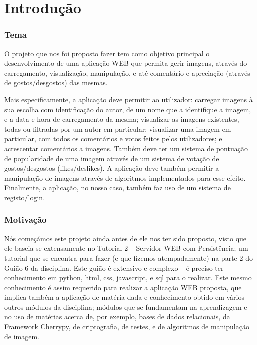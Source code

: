 \documentclass{report}
\begin{document}
\chapter{Introdução}
\label{chap.introducao}

\subsection{Tema}

O projeto que nos foi proposto fazer tem como objetivo principal o desenvolvimento de uma aplicação WEB que permita gerir imagens, através do carregamento, visualização, manipulação, e até comentário e apreciação (através de gostos/desgostos) das mesmas.

\linebreak
\bigskip

Mais especificamente, a aplicação deve permitir ao utilizador: carregar imagens à sua escolha com identificação do autor, de um nome que a identifique a imagem, e a data e hora de carregamento da mesma; visualizar as imagens existentes, todas ou filtradas por um autor em particular; visualizar uma imagem em particular, com todos os comentários e votos feitos pelos utilizadores; e acrescentar comentários a imagens. Também deve ter um sistema de pontuação de popularidade de uma imagem através de um sistema de votação de gostos/desgostos (likes/deslikes). A aplicação deve também permitir a manipulação de imagens através de algoritmos implementados para esse efeito. Finalmente, a aplicação, no nosso caso, também faz uso de um sistema de registo/login.

\subsection{Motivação}

Nós começámos este projeto ainda antes de ele nos ter sido proposto, visto que ele baseia-se extensamente no Tutorial 2 – Servidor WEB com Persistência; um tutorial que se encontra para fazer (e que fizemos atempadamente) na parte 2 do Guião 6 da disciplina. Este guião é extensivo e complexo – é preciso ter conhecimento em python, html, css, javascript, e sql para o realizar. Este mesmo conhecimento é assim requerido para realizar a aplicação WEB proposta, que implica também a aplicação de matéria dada e conhecimento obtido em vários outros módulos da disciplina; módulos que se fundamentam na aprendizagem e no uso de matérias acerca de, por exemplo, bases de dados relacionais, da Framework Cherrypy, de criptografia, de testes, e de algoritmos de manipulação de imagem.
\end{document}
